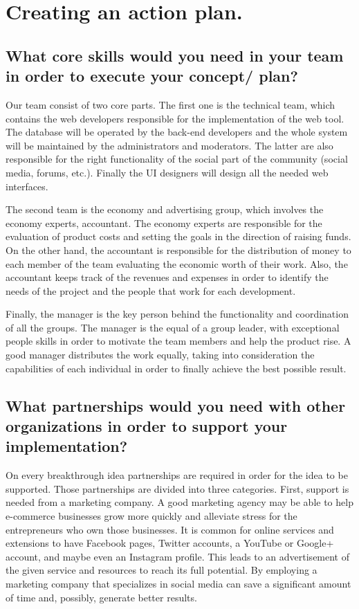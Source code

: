 \section{Creating an action plan.}

\subsection{What core skills would you need in your team in order to execute 
your concept/ plan?}

Our team consist of two core parts.
The first one is the technical team, which contains the web developers 
responsible for the implementation of the web tool. The database will be 
operated by the back-end developers and the whole system will be maintained by 
the administrators and moderators. The latter are also responsible for the right 
functionality of the social part of the community (social media, forums, etc.).
Finally the UI designers will design all the needed web interfaces.

The second team is the economy and advertising group, which involves the economy 
experts, accountant. The economy experts are responsible for the evaluation of 
product costs and setting the goals in the direction of raising funds. On the 
other hand, the accountant is responsible for the distribution of money to each 
member of the team evaluating the economic worth of their work. Also, the 
accountant keeps track of the revenues and expenses in order to identify the 
needs of the project and the people that work for each development.

Finally, the manager is the key person behind the functionality and coordination 
of all the groups. The manager is the equal of a group leader, with exceptional 
people skills in order to motivate the team members and help the product rise. 
A good manager distributes the work equally, taking into consideration the 
capabilities of each individual in order to finally achieve the best possible 
result.

\subsection{What partnerships would you need with other organizations in order 
to support your implementation?}

On every breakthrough idea partnerships are required in order for the idea to be 
supported. Those partnerships are divided into three categories.
First, support is needed from a marketing company. A good marketing agency may 
be able to help e-commerce businesses grow more quickly and alleviate stress for 
the entrepreneurs who own those businesses. It is common for online services and 
extensions to have Facebook pages, Twitter accounts, a YouTube or Google+ 
account, and maybe even an Instagram profile. This leads to an advertisement of 
the given service and resources to reach its full potential. By employing a 
marketing company that specializes in social media can save a significant amount 
of time and, possibly, generate better results.


